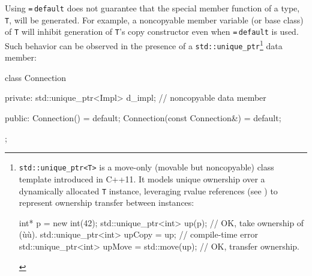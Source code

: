 Using \lstinline!=!\,\lstinline!default! does not guarantee that the special
member function of a type, \lstinline!T!, will be generated. For example, a
noncopyable member variable (or base class) of \lstinline!T! will inhibit
generation of \lstinline!T!'s copy constructor even when
\lstinline!=!\,\lstinline!default! is used. Such behavior can be observed in
the presence of a \lstinline!std::unique_ptr!{\cprotect\footnote{\lstinline!std::unique_ptr<T>!
is a move-only (movable but noncopyable) class template introduced in
C++11. It models unique ownership over a dynamically allocated
  \lstinline!T! instance, leveraging rvalue references (see )
  to represent ownership transfer between instances:

  \begin{emcppslisting}[language=C++, basicstyle={\ttfamily\footnotesize}]
  int* p = new int(42);
  std::unique_ptr<int> up(p);                   // OK, take ownership of (ù{}ù).
  std::unique_ptr<int> upCopy = up;             // compile-time error
  std::unique_ptr<int> upMove = std::move(up);  // OK, transfer ownership.
  \end{emcppslisting}
      }} data member:

\begin{emcppslisting}[language=C++]
class Connection
{
private:
    std::unique_ptr<Impl> d_impl;  // noncopyable data member

public:
    Connection() = default;
    Connection(const Connection&) = default;
};
\end{emcppslisting}

